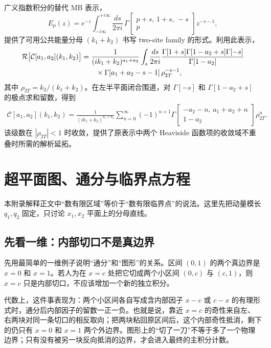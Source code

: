 ﻿\documentclass[a4paper,11pt]{article}
\begin{document}
广义指数积分的替代 MB 表示，
\begin{equation}
    E_p(z)=e^{-z}\int_{-i\infty}^{+i\infty}\frac{ds}{2\pi i}\,
    \Gamma\!\begin{bmatrix}p+s,\,1+s,\,-s\\ p\end{bmatrix}z^{-s-1},
\end{equation}
提供了可用公共能量分母 $(k_1+k_2)$ 书写 two-site family 的形式。利用此表示，
\begin{align}
    \mathcal{R}\bigl[\mathcal{C}[a_1,a_2](k_1,k_2)\bigr]
    &=\frac{1}{(ik_1+k_2)^{a_1+a_2}}\int_s\frac{ds}{2\pi i}
      \frac{\Gamma[1+s]\Gamma[1-a_2+s]\Gamma[-s]}{\Gamma[1-a_2]}\notag\\
    &\qquad\times\Gamma[a_1+a_2-s-1]\,\rho_{2T}^{-s-1},
\end{align}
其中 $\rho_{2T}=k_2/(k_1+k_2)$。在左半平面闭合围道，对 $\Gamma[-s]$ 和 $\Gamma[1-a_2+s]$ 的极点求和留数，得到
\begin{align}
    \mathcal{C}[a_1,a_2](k_1,k_2)=\frac{1}{(ik_1+k_2)^{a_1+a_2}}
    \sum_{n=0}^\infty(-1)^{n+1}\Gamma\!
    \begin{bmatrix}-a_2-n,\,a_1+a_2+n\\ 1-a_2\end{bmatrix}\rho_{2T}^n.
\end{align}
该级数在 $|\rho_{2T}|<1$ 时收敛，提供了原表示中两个 Heaviside 函数项的收敛域不重叠时所需的解析延拓。

\section{超平面图、通分与临界点方程}
\label{app:geometry-critical-points}

本附录解释正文中“数有限区域”等价于“数有限临界点”的说法。这里先把动量模长 $q_1,q_2$ 固定，只讨论 $x_1,x_2$ 平面上的分母直线。

\subsection{先看一维：内部切口不是真边界}

先用最简单的一维例子说明“通分”和“图形”的关系。区间 $(0,1)$ 的两个真边界是 $x=0$ 和 $x=1$。若人为在 $x=c$ 处把它切成两个小区间 $(0,c)$ 与 $(c,1)$，则 $x=c$ 只是内部切口，不应该增加一个新的独立积分。

代数上，这件事表现为：两个小区间各自写成含内部因子 $x-c$ 或 $c-x$ 的有理形式时，通分后内部因子的留数一正一负。也就是说，靠近 $x=c$ 的奇性来自左、右两块对同一条切口的相反取向；把两块粘回原区间后，这个内部奇性抵消，剩下的仍只有 $x=0$ 和 $x=1$ 两个外边界。图形上的“切了一刀”不等于多了一个物理边界；只有没有被另一块反向抵消的边界，才会进入最终的主积分计数。
\end{document}
